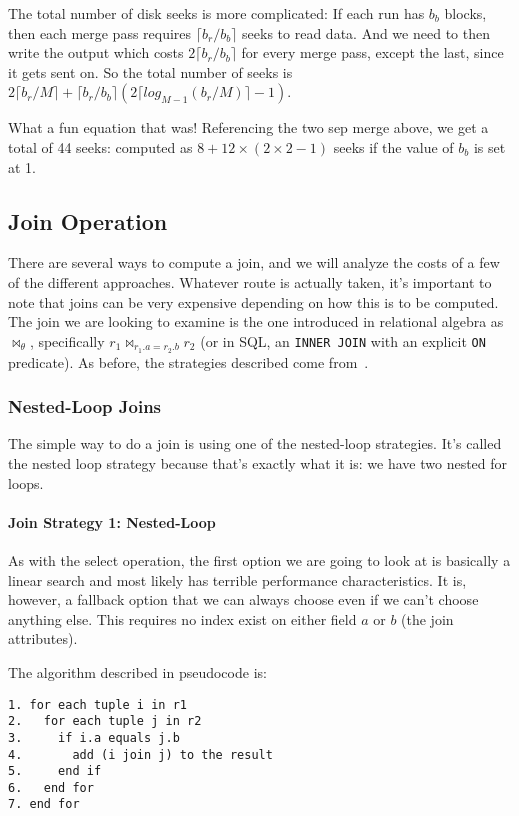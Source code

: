 The total number of disk seeks is more complicated: If each run has $b_{b}$ blocks, then each merge pass requires $\lceil b_{r}/b_{b}\rceil$ seeks to read data. And we need to then write the output which costs  $2\lceil b_{r}/b_{b}\rceil$ for every merge pass, except the last, since it gets sent on. So the total number of seeks is $2\lceil b_{r}/M\rceil + \lceil b_{r}/b_{b}\rceil(2 \lceil log_{M-1}(b_{r}/M)\rceil - 1)$.

What a fun equation that was! Referencing the two sep merge above, we get a total of 44 seeks: computed as $8 + 12 \times (2 \times 2 - 1)$ seeks if the value of $b_{b}$ is set at 1.

\subsection*{Join Operation}

There are several ways to compute a join, and we will analyze the costs of a few of the different approaches. Whatever route is actually taken, it's important to note that joins can be very expensive depending on how this is to be computed. The join we are looking to examine is the one introduced in relational algebra as $\Join_{\theta}$, specifically $r_{1} \Join_{r_{1}.a = r_{2}.b} r_{2}$ (or in SQL, an \texttt{INNER JOIN} with an explicit \texttt{ON} predicate). As before, the strategies described come from~\cite{dsc}.

\subsubsection*{Nested-Loop Joins}

The simple way to do a join is using one of the nested-loop strategies. It's called the nested loop strategy because that's exactly what it is: we have two nested for loops.

\paragraph{Join Strategy 1: Nested-Loop}
As with the select operation, the first option we are going to look at is basically a linear search and most likely has terrible performance characteristics. It is, however, a fallback option that we can always choose even if we can't choose anything else. This requires no index exist on either field $a$ or $b$ (the join attributes).

The algorithm described in pseudocode is:
\begin{verbatim}
1. for each tuple i in r1
2.   for each tuple j in r2
3.     if i.a equals j.b
4.       add (i join j) to the result
5.     end if
6.   end for
7. end for
\end{verbatim}

